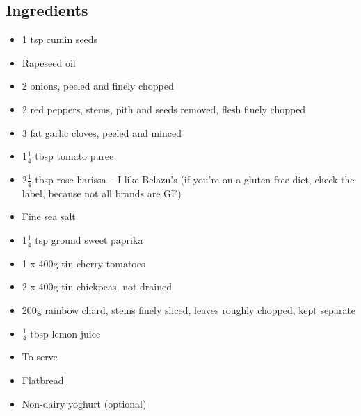 \documentclass{book}
\begin{document}
\subsection*{Ingredients}
\begin{itemize}
\item 1 tsp cumin seeds
\item Rapeseed oil
\item 2 onions, peeled and finely chopped
\item 2 red peppers, stems, pith and seeds removed, flesh finely chopped
\item 3 fat garlic cloves, peeled and minced
\item 1$\frac{1}{4}$ tbsp tomato puree
\item 2$\frac{1}{4}$ tbsp rose harissa – I like Belazu’s (if you’re on a gluten-free diet, check the label, because not all brands are GF)
\item Fine sea salt
\item 1$\frac{1}{4}$ tsp ground sweet paprika
\item 1 x 400g tin cherry tomatoes
\item 2 x 400g tin chickpeas, not drained
\item 200g rainbow chard, stems finely sliced, leaves roughly chopped, kept separate
\item $\frac{1}{4}$ tbsp lemon juice
\end{itemize}

\begin{itemize}
\item To serve
\item Flatbread
\item Non-dairy yoghurt (optional)
\end{itemize}
\end{document}
